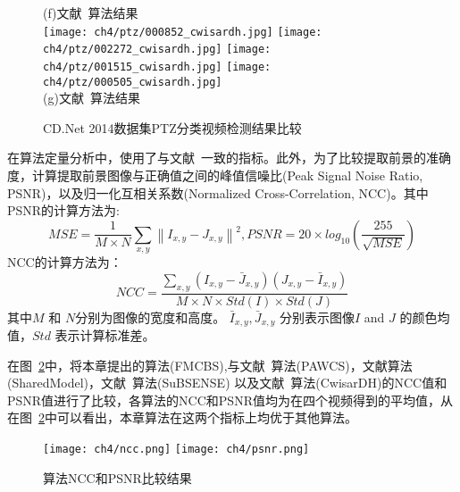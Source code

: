 \begin{figure}[htbp]
  (f)文献~算法结果\\
  \texttt{[image: ch4/ptz/000852\_cwisardh.jpg]}
  \texttt{[image: ch4/ptz/002272\_cwisardh.jpg]}
  \texttt{[image: ch4/ptz/001515\_cwisardh.jpg]}
  \texttt{[image: ch4/ptz/000505\_cwisardh.jpg]}\\
  (g)文献~算法结果\\
  \caption{CD.Net 2014数据集\cite{CD2014}PTZ分类视频检测结果比较}\label{ch4:fig:ptzResults}
\end{figure} \par

在算法定量分析中，使用了与文献~\cite{CD2014}一致的指标。此外，为了比较提取前景的准确度，计算提取前景图像与正确值之间的峰值信噪比(Peak Signal Noise Ratio, PSNR)，以及归一化互相关系数(Normalized Cross-Correlation, NCC)。其中PSNR的计算方法为:
 $$MSE=\frac{1}{M\times N}\sum_{x,y}\left \| I_{x,y}-J_{x,y} \right \|^{2},PSNR = 20\times log_{10}\left ( \frac{255}{\sqrt{MSE}}\right )$$
 NCC的计算方法为：
$$NCC=\frac{\sum_{x,y}\left( I_{x,y}-\bar J_{x,y}\right )\left(J_{x,y}- \bar I_{x,y} \right )}{M\times N\times Std(I) \times Std(J)}$$
 其中$M$ 和 $N$分别为图像的宽度和高度。 $\bar I_{x,y},\bar J_{x,y}$ 分别表示图像$I$ and $J$ 的颜色均值，$Std$ 表示计算标准差。\par
 在图~\ref{ch4:fig:nccPSNR}中，将本章提出的算法(FMCBS),与文献~算法(PAWCS)，文献算法(SharedModel)，文献~算法(SuBSENSE) 以及文献~算法(CwisarDH)的NCC值和PSNR值进行了比较，各算法的NCC和PSNR值均为在四个视频得到的平均值，从在图~\ref{ch4:fig:nccPSNR}中可以看出，本章算法在这两个指标上均优于其他算法。
\begin{figure}[htb]
  \centering%
    {\texttt{[image: ch4/ncc.png]}}%
 \hspace{1em}%
      {\texttt{[image: ch4/psnr.png]}}

  \caption{算法NCC和PSNR比较结果}
  \label{ch4:fig:nccPSNR}
\end{figure}


